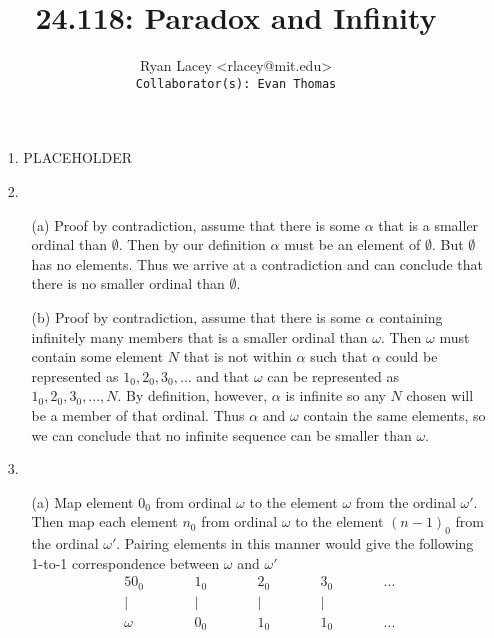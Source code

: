 \documentclass{article}
\begin{document}

\title{24.118: Paradox and Infinity}
\author{
  Ryan Lacey <rlacey@mit.edu>\\
  \footnotesize \texttt{Collaborator(s): Evan Thomas}
}
        
\maketitle
        


\begin{enumerate}
\item[1.]
	PLACEHOLDER

\item[2.]
	\begin{enumerate}
	\item[(a)]
		Proof by contradiction, assume that there is some $\alpha$ that is a smaller ordinal than $\emptyset$. Then by our definition $\alpha$ must be an element of $\emptyset$. But $\emptyset$ has no elements. Thus we arrive at a contradiction and can conclude that there is no smaller ordinal than $\emptyset$.
	\item[(b)]
		Proof by contradiction, assume that there is some $\alpha$ containing infinitely many members that is a smaller ordinal than $\omega$. Then $\omega$ must contain some element $N$ that is not within $\alpha$ such that $\alpha$ could be represented as $1_0, 2_0, 3_0, ...$ and that $\omega$ can be represented as $1_0, 2_0, 3_0, ..., N$. By definition, however, $\alpha$ is infinite so any $N$ chosen will be a member of that ordinal. Thus $\alpha$ and $\omega$ contain the same elements, so we can conclude that no infinite sequence can be smaller than $\omega$.
	\end{enumerate}

\bigskip

\item[3.]
	\begin{enumerate}
	\item[(a)]
		Map element $0_0$ from ordinal $\omega$ to the element $\omega$ from the ordinal $\omega'$. Then map each element $n_0$ from ordinal $\omega$ to the element $(n-1)_0$ from the ordinal $\omega'$. Pairing elements in this manner would give the following 1-to-1 correspondence between $\omega$ and $\omega'$\\
		
		\begin{alignat*}{5}
		    0_0  \qquad && 1_0 \qquad && 2_0  \qquad && 3_0  \qquad && ...\\
		    |  \qquad && | \qquad && |  \qquad && | \qquad && \\		    
		    \omega \qquad && 0_0 \qquad && 1_0 \qquad && 1_0  \qquad &&  ...
		\end{alignat*}
		

\end{enumerate}
\end{enumerate}
\end{document}
